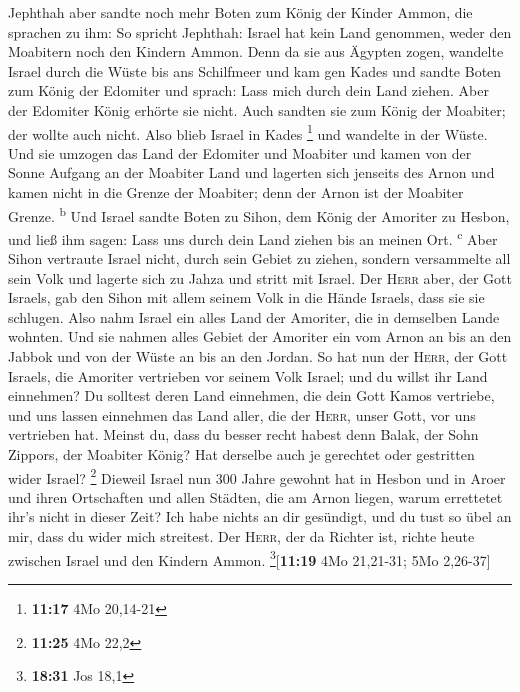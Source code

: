  Jephthah aber sandte noch mehr Boten zum König der
Kinder Ammon,  die sprachen zu ihm: So spricht Jephthah:
Israel hat kein Land genommen, weder den Moabitern noch den Kindern
Ammon.  Denn da sie aus Ägypten zogen, wandelte Israel
durch die Wüste bis ans Schilfmeer und kam gen Kades  und
sandte Boten zum König der Edomiter und sprach: Lass mich durch dein
Land ziehen. Aber der Edomiter König erhörte sie nicht. Auch sandten sie
zum König der Moabiter; der wollte auch nicht. Also blieb Israel in
Kades \footnote{\textbf{11:17} 4Mo 20,14-21}  und
wandelte in der Wüste. Und sie umzogen das Land der Edomiter und
Moabiter und kamen von der Sonne Aufgang an der Moabiter Land und
lagerten sich jenseits des Arnon und kamen nicht in die Grenze der
Moabiter; denn der Arnon ist der Moabiter Grenze. \textsuperscript{b}
 Und Israel sandte Boten zu Sihon, dem König der Amoriter
zu Hesbon, und ließ ihm sagen: Lass uns durch dein Land ziehen bis an
meinen Ort. \textsuperscript{c}  Aber Sihon vertraute
Israel nicht, durch sein Gebiet zu ziehen, sondern versammelte all sein
Volk und lagerte sich zu Jahza und stritt mit Israel. 
Der \textsc{Herr} aber, der Gott Israels, gab den Sihon mit allem seinem
Volk in die Hände Israels, dass sie sie schlugen. Also nahm Israel ein
alles Land der Amoriter, die in demselben Lande wohnten. 
Und sie nahmen alles Gebiet der Amoriter ein vom Arnon an bis an den
Jabbok und von der Wüste an bis an den Jordan.  So hat
nun der \textsc{Herr}, der Gott Israels, die Amoriter vertrieben vor
seinem Volk Israel; und du willst ihr Land einnehmen?  Du
solltest deren Land einnehmen, die dein Gott Kamos vertriebe, und uns
lassen einnehmen das Land aller, die der \textsc{Herr}, unser Gott, vor
uns vertrieben hat.  Meinst du, dass du besser recht
habest denn Balak, der Sohn Zippors, der Moabiter König? Hat derselbe
auch je gerechtet oder gestritten wider Israel? \footnote{\textbf{11:25}
  4Mo 22,2}  Dieweil Israel nun 300 Jahre gewohnt hat in
Hesbon und in Aroer und ihren Ortschaften und allen Städten, die am
Arnon liegen, warum errettetet ihr's nicht in dieser Zeit?
 Ich habe nichts an dir gesündigt, und du tust so übel an
mir, dass du wider mich streitest. Der \textsc{Herr}, der da Richter
ist, richte heute zwischen Israel und den Kindern Ammon.
\footnote{\textbf{18:31} Jos 18,1}{[}\textbf{11:19} 4Mo 21,21-31; 5Mo
2,26-37{]}

